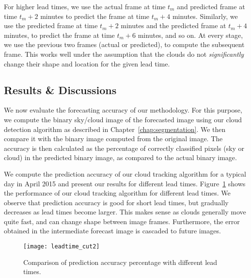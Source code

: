 For higher lead times, we use the actual frame at time $t_m$ and predicted frame at time $t_m+2$ minutes to predict the frame at time $t_m+4$ minutes. Similarly, we use the  predicted frame at time $t_m+2$ minutes and the predicted frame at $t_m+4$ minutes, to predict the frame at time $t_m+6$ minutes, and so on. At every stage, we use the previous two frames (actual or predicted), to compute the subsequent frame. This works well under the assumption that the clouds do not \emph{significantly} change their shape and location for the given lead time. 


\subsection{Results \& Discussions}

We now evaluate the forecasting accuracy of our methodology. For this purpose, we compute the binary sky/cloud image of the forecasted image using our cloud detection algorithm as described in Chapter~\ref{chap:segmentation}. We then compare it with the binary image computed from the original image. The accuracy is then calculated as the percentage of correctly classified pixels (sky or cloud) in the predicted binary image, as compared to the actual binary image. 

We compute the prediction accuracy of our cloud tracking algorithm for a typical day in April 2015 and present our results for different lead times. Figure~\ref{fig:LT} shows the performance of our cloud tracking algorithm for different lead times.  We observe that prediction accuracy is good for short lead times, but gradually decreases as lead times become larger. This makes sense as clouds generally move quite fast, and can change shape between image frames.  Furthermore, the error obtained in the intermediate forecast image is cascaded to future images.

\begin{figure}[htb]
\begin{center}
\texttt{[image: leadtime\_cut2]}
\caption{Comparison of prediction accuracy percentage with different lead times.}
\label{fig:LT}
\end{center}
\end{figure}

